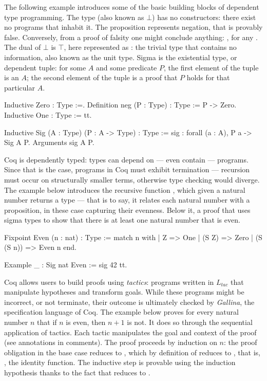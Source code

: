 \documentclass{mproj}
\begin{document}
The following example introduces some of the basic building blocks of dependent type programming. The type  (also known as $\bot$) has no constructors: there exist no programs that inhabit it. The proposition  represents negation, that  is provably false. Conversely, from a proof of falsity one might conclude anything: , for any . The dual of $\bot$ is $\top$, here represented as : the trivial type that contains no information, also known as the unit type. Sigma is the existential type, or dependent tuple: for some $A$ and some predicate $P$, the first element of the tuple is an $A$; the second element of the tuple is a proof that $P$ holds for that particular $A$.

\begin{coq}
Inductive Zero : Type :=.
Definition neg (P : Type) : Type := P -> Zero.
Inductive One : Type := tt.

Inductive Sig (A : Type) (P : A -> Type) : Type :=
  sig : forall (a : A), P a -> Sig A P.
Arguments sig {A P}.
\end{coq}

Coq is dependently typed: types can depend on --- even contain --- programs. Since that is the case, programs in Coq must exhibit termination --- recursion must occur on structurally smaller terms, otherwise type checking would diverge. The example below introduces the recursive function , which given a natural number returns a type --- that is to say, it relates each natural number with a proposition, in these case capturing their evenness. Below it, a proof that uses sigma types to show that there is at least one natural number that is even.

\begin{coq}
Fixpoint Even (n : nat) : Type :=
  match n with
  | Z         => One
  | (S Z)     => Zero
  | (S (S n)) => Even n
  end.

Example _ : Sig nat Even := sig 42 tt.
\end{coq}

Coq allows users to build proofs using \emph{tactics}: programs written in $L_{tac}$ that manipulate hypotheses and transform goals. While these programs might be incorrect, or not terminate, their outcome is ultimately checked by \emph{Gallina}, the specification language of Coq. The example below proves for every natural number $n$ that if $n$ is even, then $n+1$ is not. It does so through the sequential application of tactics. Each tactic manipulates the goal and context of the proof (see annotations in comments). The proof proceeds by induction on $n$: the proof obligation in the base case reduces to , which by definition of  reduces to , that is, , the identity function. The inductive step is provable using the induction hypothesis thanks to the fact that  reduces to .
\end{document}
